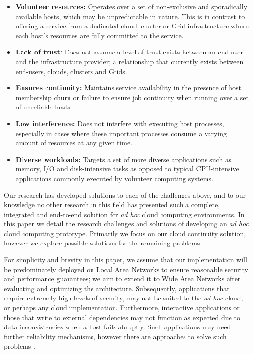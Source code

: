 \documentclass[10pt, conference, compsocconf]{IEEEtran}
\begin{document}
\begin{itemize}
\item \textbf{Volunteer resources:} Operates over a set of non-exclusive and sporadically available hosts, which may be unpredictable in nature. This is in contrast to offering a service from a dedicated cloud, cluster or Grid infrastructure where each host's resources are fully committed to the service.
\item \textbf{Lack of trust:} Does not assume a level of trust exists between an end-user and the infrastructure provider; a relationship that currently exists between end-users, clouds, clusters and Grids.
\item \textbf{Ensures continuity:} Maintains service availability in the presence of host membership churn or failure to ensure job continuity when running over a set of unreliable hosts.
\item \textbf{Low interference:} Does not interfere with executing host processes, especially in cases where these important processes consume a varying amount of resources at any given time.
\item \textbf{Diverse workloads:} Targets a set of more diverse applications such as memory, I/O and disk-intensive tasks as opposed to typical CPU-intensive applications commonly executed by volunteer computing systems.
\end{itemize}

\noindent Our research has developed solutions to each of the challenges above, and to our knowledge no other research in this field has presented such a complete, integrated and end-to-end solution for \textit{ad hoc} cloud computing environments. In this paper we detail the research challenges and solutions of developing an \textit{ad hoc} cloud computing prototype. Primarily we focus on our cloud continuity solution, however we explore possible solutions for the remaining problems.

For simplicity and brevity in this paper, we assume that our implementation will be predominately deployed on Local Area Networks to ensure reasonable security and performance guarantees; we aim to extend it to Wide Area Networks after evaluating and optimizing the architecture. Subsequently, applications that require extremely high levels of security, may not be suited to the \textit{ad hoc} cloud, or perhaps any cloud implementation. Furthermore, interactive applications or those that write to external dependencies may not function as expected due to data inconsistencies when a host fails abruptly. Such applications may need further reliability mechanisms, however there are approaches to solve such problems \cite{Cully2008}.
\end{document}
